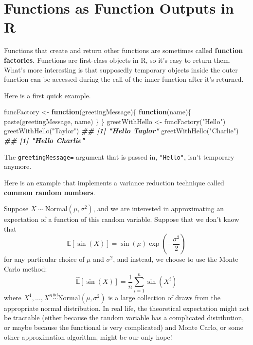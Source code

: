\documentclass[
  12pt,
]{krantz}
\makeatletter
\newenvironment{Shaded}{\begin{snugshade}}{\end{snugshade}}
\newcommand{\ControlFlowTok}[1]{\textcolor[rgb]{0.27,0.27,0.27}{\textbf{#1}}}
\newcommand{\DocumentationTok}[1]{\textcolor[rgb]{0.37,0.37,0.37}{\textbf{\textit{#1}}}}
\newcommand{\FunctionTok}[1]{\textcolor[rgb]{0,0,0}{#1}}
\newcommand{\NormalTok}[1]{#1}
\newcommand{\OtherTok}[1]{\textcolor[rgb]{0.37,0.37,0.37}{#1}}
\newcommand{\StringTok}[1]{\textcolor[rgb]{0.5,0.5,0.5}{#1}}
\newenvironment{kframe}{%
\medskip{}
\setlength{\fboxsep}{.8em}
 \def\at@end@of@kframe{}%
 \ifinner\ifhmode%
  \def\at@end@of@kframe{\end{minipage}}%
  \begin{minipage}{\columnwidth}%
 \fi\fi%
 \def\FrameCommand##1{\hskip\@totalleftmargin \hskip-\fboxsep
 \colorbox{shadecolor}{##1}\hskip-\fboxsep
     \hskip-\linewidth \hskip-\@totalleftmargin \hskip\columnwidth}%
 \MakeFramed {\advance\hsize-\width
   \@totalleftmargin\z@ \linewidth\hsize
   \@setminipage}}%
 {\par\unskip\endMakeFramed%
 \at@end@of@kframe}
\renewenvironment{Shaded}{\begin{kframe}}{\end{kframe}}
\makeatother
\begin{document}
\hypertarget{functions-as-function-outputs-in-r}{%
\section{Functions as Function Outputs in R}\label{functions-as-function-outputs-in-r}}

Functions that create and return other functions are sometimes called \textbf{function factories.} Functions are first-class objects in R, so it's easy to return them. What's more interesting is that supposedly temporary objects inside the outer function can be accessed during the call of the inner function after it's returned.

Here is a first quick example.

\begin{Shaded}
\begin{Highlighting}[]
\NormalTok{funcFactory }\OtherTok{\textless{}{-}} \ControlFlowTok{function}\NormalTok{(greetingMessage)\{}
  \ControlFlowTok{function}\NormalTok{(name)\{}
    \FunctionTok{paste}\NormalTok{(greetingMessage, name)}
\NormalTok{  \}}
\NormalTok{\}}
\NormalTok{greetWithHello }\OtherTok{\textless{}{-}} \FunctionTok{funcFactory}\NormalTok{(}\StringTok{"Hello"}\NormalTok{)}
\FunctionTok{greetWithHello}\NormalTok{(}\StringTok{"Taylor"}\NormalTok{)}
\DocumentationTok{\#\# [1] "Hello Taylor"}
\FunctionTok{greetWithHello}\NormalTok{(}\StringTok{"Charlie"}\NormalTok{)}
\DocumentationTok{\#\# [1] "Hello Charlie"}
\end{Highlighting}
\end{Shaded}

The \texttt{greetingMessage=} argument that is passed in, \texttt{"Hello"}, isn't temporary anymore.

Here is an example that implements a variance reduction technique called \textbf{common random numbers}.

Suppose \(X \sim \text{Normal}(\mu, \sigma^2)\), and we are interested in approximating an expectation of a function of this random variable. Suppose that we don't know that
\[
\mathbb{E}[\sin(X)] = \sin(\mu) \exp\left(-\frac{\sigma^2}{2}\right)
\]
for any particular choice of \(\mu\) and \(\sigma^2\), and instead, we choose to use the Monte Carlo method:
\[
\hat{\mathbb{E}}[\sin(X)] = \frac{1}{n}\sum_{i=1}^n\sin(X^i)
\]
where \(X^1, \ldots, X^n \overset{\text{iid}}{\sim} \text{Normal}(\mu, \sigma^2)\) is a large collection of draws from the appropriate normal distribution. In real life, the theoretical expectation might not be tractable (either because the random variable has a complicated distribution, or maybe because the functional is very complicated) and Monte Carlo, or some other approximation algorithm, might be our only hope!
\end{document}

